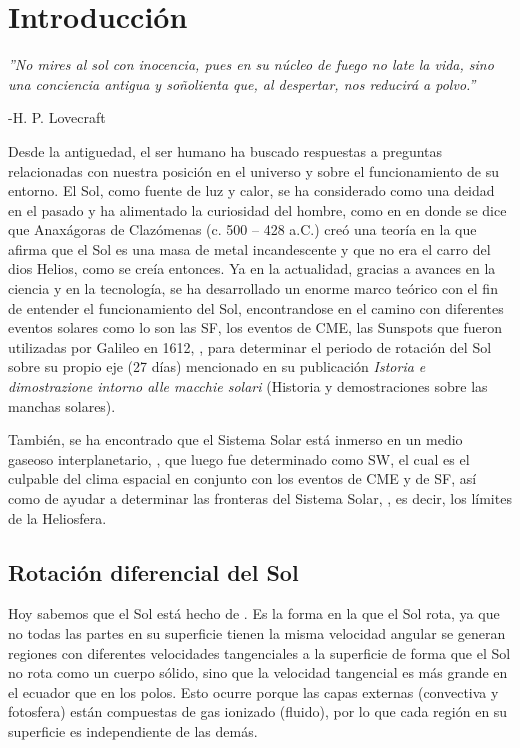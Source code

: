 \chapter{Introducción} 


\begin{flushright}
\textit{''No mires al sol con inocencia, pues en su núcleo de fuego no late la vida, sino una conciencia antigua y soñolienta que, al despertar, nos reducirá a polvo.''}

-H. P. Lovecraft
\end{flushright}

Desde la antiguedad, el ser humano ha buscado respuestas a preguntas relacionadas con nuestra posición en el universo y sobre el funcionamiento de su entorno. El Sol, como fuente de luz y calor, se ha considerado como una deidad en el pasado y ha alimentado la curiosidad del hombre, como en \cite[e.g.,]{2010anaxagoras} en donde se dice que Anaxágoras de Clazómenas (c. 500 – 428 a.C.) creó una teoría en la que afirma que el Sol es una masa de metal incandescente y que no era el carro del dios Helios, como se creía entonces. Ya en la actualidad, gracias a avances en la ciencia y en la tecnología, se ha desarrollado un enorme marco teórico con el fin de entender el funcionamiento del Sol, encontrandose en el camino con diferentes eventos solares como lo son las \ac{SF}, los eventos de \ac{CME}, las \ac{Sunspots} que fueron utilizadas por Galileo en 1612, \cite[e.g.,]{vaquero-2009}, para determinar el periodo de rotación del Sol sobre su propio eje (27 días) mencionado en su publicación \textit{Istoria e dimostrazione intorno alle macchie solari} (Historia y demostraciones sobre las manchas solares). 

También, se ha encontrado que el Sistema Solar está inmerso en un medio gaseoso interplanetario, \cite{1951ZA.....29..274B, parker-1958}, que luego fue determinado como \ac{SW}, el cual es el culpable del clima espacial en conjunto con los eventos de \ac{CME} y de \ac{SF}, así como de ayudar a determinar las fronteras del Sistema Solar, \cite{stone-2013}, es decir, los límites de la Heliosfera.



\section{Rotación diferencial del Sol}
Hoy sabemos que el Sol está hecho de .
Es la forma en la que el Sol rota, ya que no todas las partes en su superficie tienen la misma velocidad angular se generan regiones con diferentes velocidades tangenciales a la superficie de forma que el Sol no rota como un cuerpo sólido, sino que la velocidad tangencial es más grande en el ecuador que en los polos. Esto ocurre porque las capas externas (convectiva y fotosfera) están compuestas de gas ionizado (fluido), por lo que cada región en su superficie es independiente de las demás.

